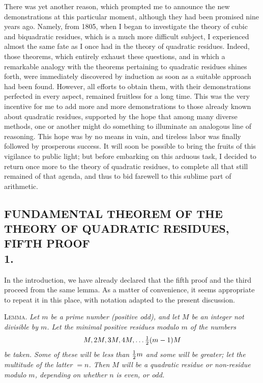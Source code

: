 \documentclass[twoside,12pt]{memoir}
\let\oldfrac\frac
\def\frac#1#2{\mathchoice{\tfrac{#1}{#2}}{\oldfrac{#1}{#2}}{\genfrac{}{}{}{2}{#1}{#2\mathstrut}}{\genfrac{}{}{}{3}{#1}{#2\mathstrut}}}
\begin{document}
There was yet another reason, which prompted me to announce the new demonstrations at this particular moment, although they had been promised nine years ago.  Namely, from 1805, when I began to investigate the theory of cubic and biquadratic residues, which is a much more difficult subject, I experienced almost the same fate as I once had in the theory of quadratic residues. Indeed, those theorems, which entirely exhaust these questions, and in which a remarkable analogy with the theorems pertaining to quadratic residues shines forth, were immediately discovered by induction as soon as a suitable approach had been found.  However, all efforts to obtain them, with their demonstrations perfected in every aspect, remained fruitless for a long time. This was the very incentive for me to add more and more demonstrations to those already known about quadratic residues, supported by the hope that among many diverse methods, one or another might do something to illuminate an analogous line of reasoning. This hope was by no means in vain, and tireless labor was finally followed by prosperous success. It will soon be possible to bring the fruits of this vigilance to public light; but before embarking on this arduous task, I decided to return once more to the theory of quadratic residues, to complete all that still remained of that agenda, and thus to bid farewell to this sublime part of arithmetic.\pagebreak%

\subsection*{{\scriptsize FUNDAMENTAL THEOREM OF THE THEORY OF QUADRATIC RESIDUES, FIFTH PROOF}\\[0.5\baselineskip]
1.}
 
In the introduction, we have already declared that the fifth proof and the third proceed from the same lemma.  As a matter of convenience, it seems appropriate to repeat it in this place, with notation adapted to the present discussion.

\textsc{Lemma.} \textit{Let \(m\) be a prime number (positive odd), and let \(M\) be an integer not divisible by \(m\).  Let the minimal positive residues modulo \(m\) of the numbers}
\[M, 2 M, 3 M, 4 M, \ldots \frac{1}{2}(m-1) M\]
\textit{be taken.  Some of these will be less than \(\frac{1}{2} m\) and some will be greater; let the multitude of the latter \(=n\). Then \(M\) will be a quadratic residue or non-residue modulo \(m\), depending on whether \(n\) is even, or odd.}
\end{document}
